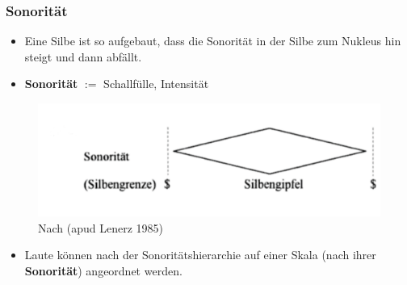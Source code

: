 
\begin{frame}
\frametitle{Sonorität}

\begin{itemize}
	\item Eine Silbe ist so aufgebaut, dass die Sonorität in der Silbe zum Nukleus hin steigt und dann abfällt.

	\item \textbf{Sonorität} $:=$ Schallfülle, Intensität

\end{itemize}

\begin{figure}
\centering
\includegraphics[scale=.2]{material/03bSonoritaetRamers}
\caption{Nach \citet[93]{Ramers08a} (apud Lenerz 1985)}
\end{figure}


\begin{itemize}
	\item Laute können nach der Sonoritätshierarchie auf einer Skala (nach ihrer \textbf{Sonorität}) angeordnet werden.
\end{itemize}

\end{frame}




